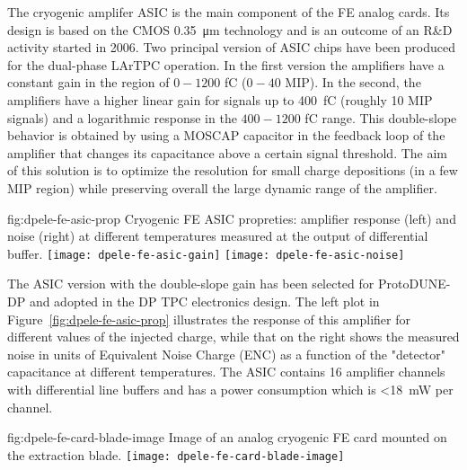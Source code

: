 The cryogenic amplifer ASIC is the main component of the FE analog cards. Its design is based on the CMOS \SI{0.35}{\micro\meter} technology and is an outcome of an R\&D  activity started in 2006. Two principal version of ASIC chips have been produced for the dual-phase LArTPC operation. In the first version the amplifiers have a constant gain in the region of $0-1200$ \si{\femto\coulomb} ($0-40$ MIP). In the second, the amplifiers have a higher linear gain for signals up to \SI{400}{\femto\coulomb} (roughly 10 MIP signals) and a logarithmic response in the  $400-1200$ \si{\femto\coulomb} range. This double-slope behavior is obtained by using a MOSCAP capacitor in the feedback loop of the amplifier that changes its capacitance above a certain signal threshold. The aim of this solution is to optimize the resolution for small charge depositions (in a few MIP region) while preserving overall the large dynamic range of the amplifier.


\begin{dunefigure}{fig:dpele-fe-asic-prop}
{Cryogenic FE ASIC propreties: amplifier response (left) and noise (right) at different temperatures measured at the output of differential buffer.}
\texttt{[image: dpele-fe-asic-gain]}
\texttt{[image: dpele-fe-asic-noise]}
\end{dunefigure}

The ASIC version with the double-slope gain has been selected for ProtoDUNE-DP and adopted in the DP TPC electronics design. The left plot in Figure~\ref{fig:dpele-fe-asic-prop} illustrates the response of this amplifier for different values of the injected charge, while that on the right shows the measured noise in units of Equivalent Noise Charge (ENC) as a function of the "detector" capacitance at different temperatures. The ASIC contains \num{16} amplifier channels with differential line buffers and has a power consumption which is \SI{<18}{\milli\watt} per channel. 

\begin{dunefigure}{fig:dpele-fe-card-blade-image}
{Image of an analog cryogenic FE card mounted on the extraction blade.}
\texttt{[image: dpele-fe-card-blade-image]}
\end{dunefigure}

